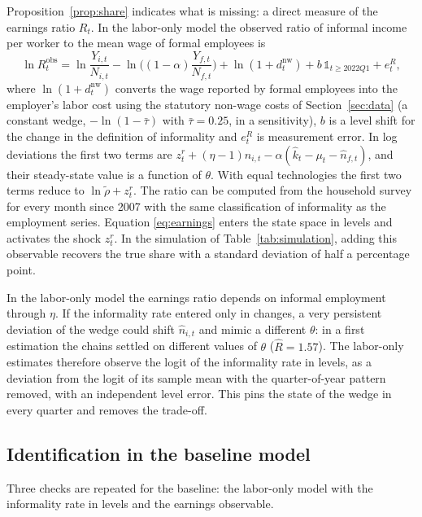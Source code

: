 Proposition~\ref{prop:share} indicates what is missing: a direct measure of the earnings ratio $R_t$. In the labor-only model the observed ratio of informal income per worker to the mean wage of formal employees is
\begin{equation}
\ln R^{\mathrm{obs}}_t = \ln\frac{Y_{i,t}}{N_{i,t}} - \ln\Big((1-\alpha)\frac{Y_{f,t}}{N_{f,t}}\Big) + \ln(1+d_t^{\mathrm{nw}}) + b\,\mathbb{1}_{t\ge 2022Q1} + e^{R}_t,
\label{eq:earnings}
\end{equation}
where $\ln(1+d_t^{\mathrm{nw}})$ converts the wage reported by formal employees into the employer's labor cost using the statutory non-wage costs of Section~\ref{sec:data} (a constant wedge, $-\ln(1-\bar\tau)$ with $\bar\tau=0.25$, in a sensitivity), $b$ is a level shift for the change in the definition of informality and $e^{R}_t$ is measurement error. In log deviations the first two terms are $z^r_t + (\eta-1)\hat n_{i,t} - \alpha(\hat k_t - \mu_t - \hat n_{f,t})$, and their steady-state value is a function of $\theta$. With equal technologies the first two terms reduce to $\ln\tilde\rho + z^r_t$. The ratio can be computed from the household survey for every month since 2007 with the same classification of informality as the employment series. Equation \eqref{eq:earnings} enters the state space in levels and activates the shock $z^r_t$. In the simulation of Table~\ref{tab:simulation}, adding this observable recovers the true share with a standard deviation of half a percentage point.

In the labor-only model the earnings ratio depends on informal employment through $\eta$. If the informality rate entered only in changes, a very persistent deviation of the wedge could shift $\hat n_{i,t}$ and mimic a different $\theta$: in a first estimation the chains settled on different values of $\theta$ ($\hat R=1.57$). The labor-only estimates therefore observe the logit of the informality rate in levels, as a deviation from the logit of its sample mean with the quarter-of-year pattern removed, with an independent level error. This pins the state of the wedge in every quarter and removes the trade-off.

\subsection{Identification in the baseline model}
\label{sec:id-baseline}

Three checks are repeated for the baseline: the labor-only model with the informality rate in levels and the earnings observable.

